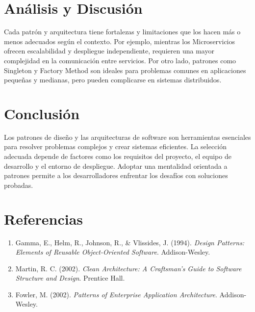 \documentclass{article}
\begin{document}
\section{Análisis y Discusión}
Cada patrón y arquitectura tiene fortalezas y limitaciones que los hacen más o menos adecuados según el contexto. Por ejemplo, mientras los Microservicios ofrecen escalabilidad y despliegue independiente, requieren una mayor complejidad en la comunicación entre servicios. Por otro lado, patrones como Singleton y Factory Method son ideales para problemas comunes en aplicaciones pequeñas y medianas, pero pueden complicarse en sistemas distribuidos.

\section{Conclusión}
Los patrones de diseño y las arquitecturas de software son herramientas esenciales para resolver problemas complejos y crear sistemas eficientes. La selección adecuada depende de factores como los requisitos del proyecto, el equipo de desarrollo y el entorno de despliegue. Adoptar una mentalidad orientada a patrones permite a los desarrolladores enfrentar los desafíos con soluciones probadas.

\section{Referencias}
\begin{enumerate}
    \item Gamma, E., Helm, R., Johnson, R., \& Vlissides, J. (1994). \textit{Design Patterns: Elements of Reusable Object-Oriented Software}. Addison-Wesley.
    \item Martin, R. C. (2002). \textit{Clean Architecture: A Craftsman’s Guide to Software Structure and Design}. Prentice Hall.
    \item Fowler, M. (2002). \textit{Patterns of Enterprise Application Architecture}. Addison-Wesley.
\end{enumerate}
\end{document}
